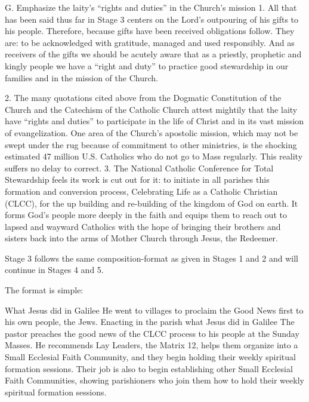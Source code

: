 \documentclass[oneside]{book}
\begin{document}
G. Emphasize the laity's ``rights and duties'' in
  the Church's mission
1. All that has been said thus far in Stage 3 centers on the Lord's outpouring
of his gifts to his people. Therefore, because gifts have been received
obligations follow. They are: to be acknowledged with gratitude, managed and
used responsibly. And as receivers of the gifts we should be acutely aware that
as a priestly, prophetic and kingly people we have a ``right and duty'' to
practice good stewardship in our families and in the mission of the Church.

2. The many quotations cited above from the Dogmatic Constitution of the Church
and the Catechism of the Catholic Church attest mightily that the laity have
``rights and duties'' to participate in the life of Christ and in its vast
mission of evangelization. One area of the Church's apostolic mission, which may
not be swept under the rug because of commitment to other ministries, is the
shocking estimated 47 million U.S. Catholics who do not go to Mass
regularly. This reality suffers no delay to correct.
3. The National Catholic Conference for Total Stewardship feels its work is cut
out for it: to initiate in all parishes this formation and conversion process,
Celebrating Life as a Catholic Christian (CLCC), for the up building and
re-building of the kingdom of God on earth. It forms God's people more deeply in
the faith and equips them to reach out to lapsed and wayward Catholics with the
hope of bringing their brothers and sisters back into the arms of Mother Church
through Jesus, the Redeemer.

Stage 3 follows the same composition-format as given in Stages 1 and 2 and will
continue in Stages 4 and 5.

The format is simple:

What Jesus did in Galilee
He went to villages to proclaim the Good News first to his own people, the Jews.
Enacting in the parish what Jesus did in Galilee
The pastor preaches the good news of the CLCC process to his people at the
Sunday Masses. He recommends Lay Leaders, the Matrix 12, helps them organize
into a Small Ecclesial Faith Community, and they begin holding their weekly
spiritual formation sessions. Their job is also to begin establishing other
Small Ecclesial Faith Communities, showing parishioners who join them how to
hold their weekly spiritual formation sessions.
\end{document}

